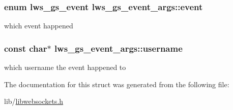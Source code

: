 \subsubsection[{\texorpdfstring{event}{event}}]{\setlength{\rightskip}{0pt plus 5cm}enum {\bf lws\+\_\+gs\+\_\+event} lws\+\_\+gs\+\_\+event\+\_\+args\+::event}\hypertarget{structlws__gs__event__args_a477274f8ca22ba7411b9285b9dc8dd06}{}\label{structlws__gs__event__args_a477274f8ca22ba7411b9285b9dc8dd06}
which event happened 
\subsubsection[{\texorpdfstring{username}{username}}]{\setlength{\rightskip}{0pt plus 5cm}const char$\ast$ lws\+\_\+gs\+\_\+event\+\_\+args\+::username}\hypertarget{structlws__gs__event__args_a2bec693d8a43730d487004a44326178b}{}\label{structlws__gs__event__args_a2bec693d8a43730d487004a44326178b}
which username the event happened to 

The documentation for this struct was generated from the following file\+:\begin{DoxyCompactItemize}
\item 
lib/\hyperlink{libwebsockets_8h}{libwebsockets.\+h}\end{DoxyCompactItemize}
